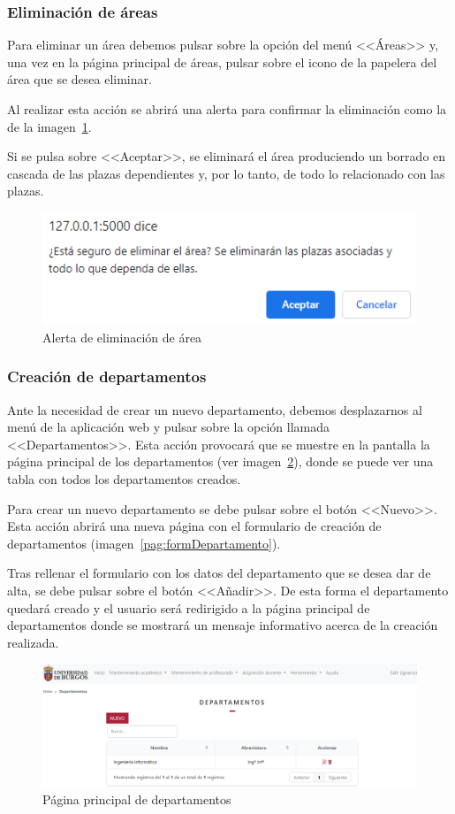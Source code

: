 \subsubsection{Eliminación de áreas}
Para eliminar un área debemos pulsar sobre la opción del menú <<Áreas>> y, una vez en la página principal de áreas, pulsar sobre el icono de la papelera del área que se desea eliminar.

Al realizar esta acción se abrirá una alerta para confirmar la eliminación como la de la imagen~\ref{pag:alertElArea}.

Si se pulsa sobre <<Aceptar>>, se eliminará el área produciendo un borrado en cascada de las plazas dependientes y, por lo tanto, de todo lo relacionado con las plazas.

\begin{figure}
	\centering
	\includegraphics[width=.65\textwidth]{../img/Anexos/Manual usuario/alertElArea.png}
	\caption{Alerta de eliminación de área}\label{pag:alertElArea}
\end{figure}


\subsubsection{Creación de departamentos}
Ante la necesidad de crear un nuevo departamento, debemos desplazarnos al menú de la aplicación web y pulsar sobre la opción llamada <<Departamentos>>. 
Esta acción provocará que se muestre en la pantalla la página principal de los departamentos (ver imagen~\ref{pag:departamentos}), donde se puede ver una tabla con todos los departamentos creados.

Para crear un nuevo departamento se debe pulsar sobre el botón <<Nuevo>>.
Esta acción abrirá una nueva página con el formulario de creación de departamentos (imagen~\ref{pag:formDepartamento}).

Tras rellenar el formulario con los datos del departamento que se desea dar de alta, se debe pulsar sobre el botón <<Añadir>>.
De esta forma el departamento quedará creado y el usuario será redirigido a la página principal de departamentos donde se mostrará un mensaje informativo acerca de la creación realizada.

\begin{figure}
	\centering
	\includegraphics[width=\textwidth]{../img/Anexos/Manual usuario/departamentos.png}
	\caption{Página principal de departamentos}\label{pag:departamentos}
\end{figure}

